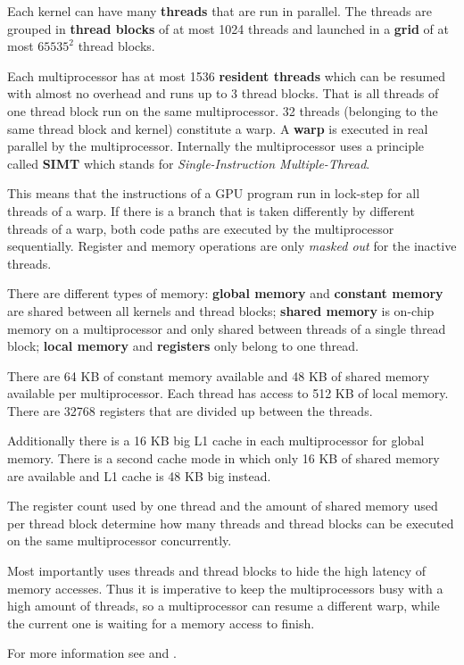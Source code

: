Each kernel can have many \textbf{threads} that are run in parallel. The threads are grouped in \textbf{thread blocks} of at most 1024 threads and launched in a \textbf{grid} of at most $65535^2$ thread blocks.

Each multiprocessor has at most 1536 \textbf{resident threads} which can be resumed with almost no overhead and runs up to 3 thread blocks. That is all threads of one thread block run on the same multiprocessor. 32 threads (belonging to the same thread block and kernel) constitute a warp. A \textbf{warp} is executed in real parallel by the multiprocessor. Internally the multiprocessor uses a principle called \textbf{SIMT} which stands for \textit{Single-Instruction Multiple-Thread}.

This means that the instructions of a GPU program run in lock-step for all threads of a warp. If there is a branch that is taken differently by different threads of a warp, both code paths are executed by the multiprocessor sequentially. Register and memory operations are only \textit{masked out} for the inactive threads.

There are different types of memory: \textbf{global memory} and \textbf{constant memory} are shared between all kernels and thread blocks; \textbf{shared memory} is on-chip memory on a multiprocessor and only shared between threads of a single thread block; \textbf{local memory} and \textbf{registers} only belong to one thread.

There are 64 KB of constant memory available and 48 KB of shared memory available per multiprocessor. Each thread has access to 512 KB of local memory. There are 32768 registers that are divided up between the threads.

Additionally there is a 16 KB big L1 cache in each multiprocessor for global memory. There is a second cache mode in which only 16 KB of shared memory are available and L1 cache is 48 KB big instead.

The register count used by one thread and the amount of shared memory used per thread block determine how many threads and thread blocks can be executed on the same multiprocessor concurrently.

Most importantly \cuda{} uses threads and thread blocks to hide the high latency of memory accesses. Thus it is imperative to keep the multiprocessors busy with a high amount of threads, so a multiprocessor can resume a different warp, while the current one is waiting for a memory access to finish.

For more information see \cite{cuda11progguide} and \cite{cuda11bestpract}.